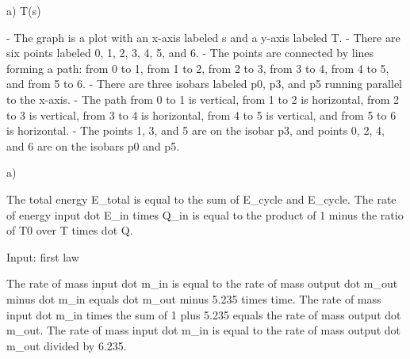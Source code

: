 a) T(s)

- The graph is a plot with an x-axis labeled s and a y-axis labeled T.
- There are six points labeled 0, 1, 2, 3, 4, 5, and 6.
- The points are connected by lines forming a path: from 0 to 1, from 1 to 2, from 2 to 3, from 3 to 4, from 4 to 5, and from 5 to 6.
- There are three isobars labeled p0, p3, and p5 running parallel to the x-axis.
- The path from 0 to 1 is vertical, from 1 to 2 is horizontal, from 2 to 3 is vertical, from 3 to 4 is horizontal, from 4 to 5 is vertical, and from 5 to 6 is horizontal.
- The points 1, 3, and 5 are on the isobar p3, and points 0, 2, 4, and 6 are on the isobars p0 and p5.

a)

The total energy E_total is equal to the sum of E_cycle and E_cycle.
The rate of energy input dot E_in times Q_in is equal to the product of 1 minus the ratio of T0 over T times dot Q.

Input: first law

The rate of mass input dot m_in is equal to the rate of mass output dot m_out minus dot m_in equals dot m_out minus 5.235 times time.
The rate of mass input dot m_in times the sum of 1 plus 5.235 equals the rate of mass output dot m_out.
The rate of mass input dot m_in is equal to the rate of mass output dot m_out divided by 6.235.